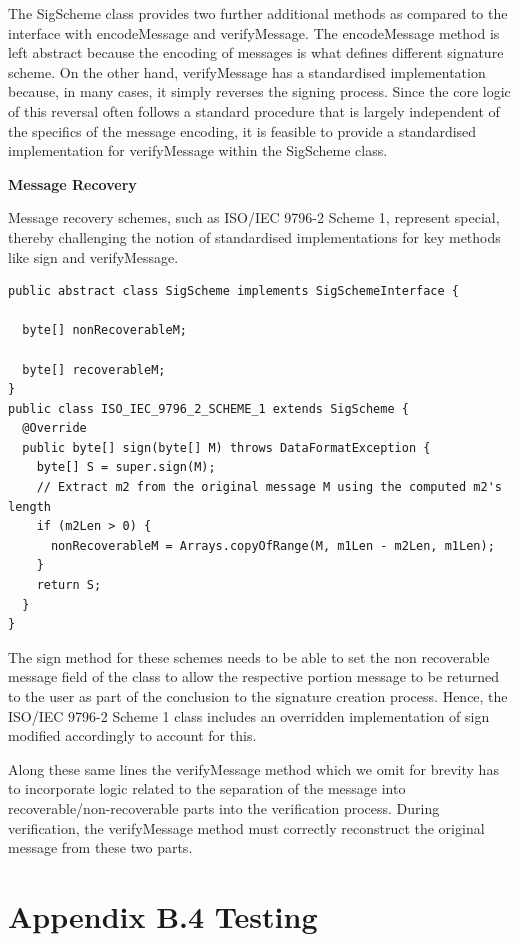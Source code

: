 \documentclass[]{final_report}
\theoremstyle{definition}
\begin{document}
The SigScheme class provides two further additional methods as compared to the interface with encodeMessage and verifyMessage. The encodeMessage method is left abstract because the encoding of messages is what defines different signature scheme. On the other hand, verifyMessage has a standardised implementation because, in many cases, it simply reverses the signing process. Since the core logic of this reversal often follows a standard procedure that is largely independent of the specifics of the message encoding, it is feasible to provide a standardised implementation for verifyMessage within the SigScheme class.

\textbf{Message Recovery}

Message recovery schemes, such as ISO/IEC 9796-2 Scheme 1, represent special, thereby challenging the notion of standardised implementations for key methods like sign and verifyMessage.
\begin{lstlisting}[caption=Implementation changes for Message Recovery Schemes]
public abstract class SigScheme implements SigSchemeInterface {

  byte[] nonRecoverableM;

  byte[] recoverableM;
}
public class ISO_IEC_9796_2_SCHEME_1 extends SigScheme {
  @Override
  public byte[] sign(byte[] M) throws DataFormatException {
    byte[] S = super.sign(M);
    // Extract m2 from the original message M using the computed m2's length
    if (m2Len > 0) {
      nonRecoverableM = Arrays.copyOfRange(M, m1Len - m2Len, m1Len);
    }
    return S;
  }
}
 \end{lstlisting}
The sign method for these schemes needs to be able to set the non recoverable message field of the class to allow the respective portion message to be returned to the user as part of the conclusion to the signature creation process. Hence, the ISO/IEC 9796-2 Scheme 1 class includes an overridden implementation of sign modified accordingly to account for this.

Along these same lines the verifyMessage method which we omit for brevity has to incorporate logic related to the separation of the message into recoverable/non-recoverable parts into the verification process. During verification, the verifyMessage method must correctly reconstruct the original message from these two parts. 
 

\section{Appendix B.4 Testing}
\end{document}
